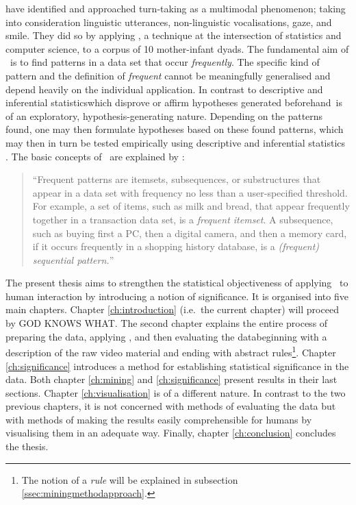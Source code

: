 \citet{rohlfing_multimodal_underreview} have identified and approached turn-taking as a multimodal phenomenon; taking into consideration linguistic utterances, non-linguistic vocalisations, gaze, and smile.
They did so by applying \fpmlower, a technique at the intersection of statistics and computer science, to a corpus of 10 mother-infant dyads.
The fundamental aim of \fpmlower\ is to find patterns in a data set that occur \emph{frequently}.
The specific kind of pattern and the definition of \emph{frequent} cannot be meaningfully generalised and depend heavily on the individual application.
In contrast to descriptive and inferential statistics\dash which disprove or affirm hypotheses generated beforehand\dash \fpmlower\ is of an exploratory, hypothesis-generating nature.
Depending on the patterns found, one may then formulate hypotheses based on these found patterns, which may then in turn be tested empirically using descriptive and inferential statistics \cite[]{rohlfing_multimodal_underreview,han_data_2012}. %
The basic concepts of \fpmlower\ are explained by \citet[, emphasis in original]{han_frequent_2007}:
\begin{quote}
``Frequent patterns are itemsets, subsequences, or substructures that appear in a data set with frequency no less than a user-specified threshold.
For example, a set of items, such as milk and bread, that appear frequently together in a transaction data set, is a \emph{frequent itemset}.
A subsequence, such as buying first a PC, then a digital camera, and then a memory card, if it occurs frequently in a shopping history database, is a \emph{(frequent) sequential pattern.}''
\end{quote}

The present thesis aims to strengthen the statistical objectiveness of applying \fpmlower\ to human interaction by introducing a notion of significance.
It is organised into five main chapters.
Chapter \ref{ch:introduction} (i.e.\ the current chapter) will proceed by GOD KNOWS WHAT.
The second chapter explains the entire process of preparing the data, applying \fpmlower, and then evaluating the data\dash beginning with a description of the raw video material and ending with abstract rules\footnote{The notion of a \emph{rule} will be explained in subsection \ref{ssec:miningmethodapproach}.}.
Chapter \ref{ch:significance} introduces a method for establishing statistical significance in the data.
Both chapter \ref{ch:mining} and \ref{ch:significance} present results in their last sections.
Chapter \ref{ch:visualisation} is of a different nature.
In contrast to the two previous chapters, it is not concerned with methods of evaluating the data but with methods of making the results easily comprehensible for humans by visualising them in an adequate way.
Finally, chapter \ref{ch:conclusion} concludes the thesis.





